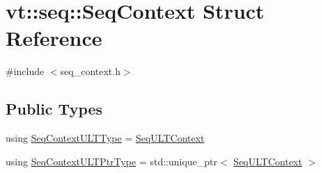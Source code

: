 \hypertarget{structvt_1_1seq_1_1_seq_context}{}\section{vt\+:\+:seq\+:\+:Seq\+Context Struct Reference}
\label{structvt_1_1seq_1_1_seq_context}


{\ttfamily \#include $<$seq\+\_\+context.\+h$>$}

\subsection*{Public Types}
\begin{DoxyCompactItemize}
\item 
using \hyperlink{structvt_1_1seq_1_1_seq_context_a9a865b72336ccccc5baf61f0b748ee56}{Seq\+Context\+U\+L\+T\+Type} = \hyperlink{structvt_1_1seq_1_1_seq_u_l_t_context}{Seq\+U\+L\+T\+Context}
\item 
using \hyperlink{structvt_1_1seq_1_1_seq_context_a7e5dc3958df8473c5bcd938f0f2cf933}{Seq\+Context\+U\+L\+T\+Ptr\+Type} = std\+::unique\+\_\+ptr$<$ \hyperlink{structvt_1_1seq_1_1_seq_u_l_t_context}{Seq\+U\+L\+T\+Context} $>$
\end{DoxyCompactItemize}
